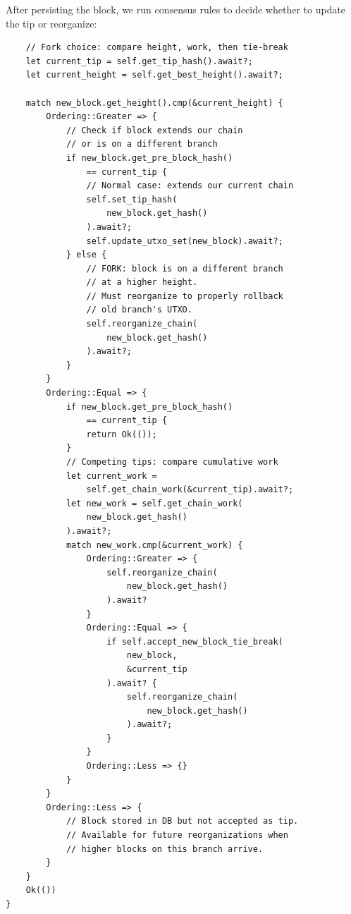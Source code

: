 After persisting the block, we run consensus rules to decide whether to update the tip or reorganize:

\begin{listing}[htbp]
\caption{Fork choice and reorg decision (part 2)}
\label{lst:ch11-add-block-2}
\begin{verbatim}
    // Fork choice: compare height, work, then tie-break
    let current_tip = self.get_tip_hash().await?;
    let current_height = self.get_best_height().await?;

    match new_block.get_height().cmp(&current_height) {
        Ordering::Greater => {
            // Check if block extends our chain
            // or is on a different branch
            if new_block.get_pre_block_hash()
                == current_tip {
                // Normal case: extends our current chain
                self.set_tip_hash(
                    new_block.get_hash()
                ).await?;
                self.update_utxo_set(new_block).await?;
            } else {
                // FORK: block is on a different branch
                // at a higher height.
                // Must reorganize to properly rollback
                // old branch's UTXO.
                self.reorganize_chain(
                    new_block.get_hash()
                ).await?;
            }
        }
        Ordering::Equal => {
            if new_block.get_pre_block_hash()
                == current_tip {
                return Ok(());
            }
            // Competing tips: compare cumulative work
            let current_work =
                self.get_chain_work(&current_tip).await?;
            let new_work = self.get_chain_work(
                new_block.get_hash()
            ).await?;
            match new_work.cmp(&current_work) {
                Ordering::Greater => {
                    self.reorganize_chain(
                        new_block.get_hash()
                    ).await?
                }
                Ordering::Equal => {
                    if self.accept_new_block_tie_break(
                        new_block,
                        &current_tip
                    ).await? {
                        self.reorganize_chain(
                            new_block.get_hash()
                        ).await?;
                    }
                }
                Ordering::Less => {}
            }
        }
        Ordering::Less => {
            // Block stored in DB but not accepted as tip.
            // Available for future reorganizations when
            // higher blocks on this branch arrive.
        }
    }
    Ok(())
}
\end{verbatim}
\end{listing}

